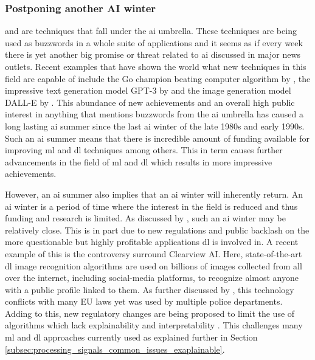 
\subsubsection{Postponing another AI winter}
\label{subsubsec:bci_gaining_popularity_improved_data_processing_no_ai_winter}

 and  are techniques that fall under the \gls{ai} umbrella.
These techniques are being used as buzzwords in a whole suite of applications and it seems as if every week there is yet another big promise or threat related to \gls{ai} discussed in major news outlets.
Recent examples that have shown the world what new techniques in this field are capable of include the Go champion beating computer algorithm by \citet{alphago}, the impressive text generation model GPT-3 by \citet{GPT3} and the image generation model DALL-E by \citet{dall_e}.
This abundance of new achievements and an overall high public interest in anything that mentions buzzwords from the \gls{ai} umbrella has caused a long lasting \gls{ai} summer since the last \gls{ai} winter of the late 1980s and early 1990s.
Such an \gls{ai} summer means that there is incredible amount of funding available for improving \gls{ml} and \gls{dl} techniques among others.
This in term causes further advancements in the field of \gls{ml} and \gls{dl} which results in more impressive achievements.

However, an \gls{ai} summer also implies that an \gls{ai} winter will inherently return.
An \gls{ai} winter is a period of time where the interest in the field is reduced and thus funding and research is limited.
As discussed by \citet{new_ai_winter}, such an \gls{ai} winter may be relatively close.
This is in part due to new regulations and public backlash on the more questionable but highly profitable applications \gls{dl} is involved in.
A recent example of this is the controversy surround Clearview AI.
Here, state-of-the-art \gls{dl} image recognition algorithms are used on billions of images collected from all over the internet, including social-media platforms, to recognize almost anyone with a public profile linked to them.
As further discussed by \citet{clearview_ai}, this technology conflicts with many EU laws yet was used by multiple police departments.
Adding to this, new regulatory changes are being proposed to limit the use of algorithms which lack explainability and interpretability \citep{eu_ai_blackbox_report, explainable_ai_policy}.
This challenges many \gls{ml} and \gls{dl} approaches currently used as explained further in Section \ref{subsec:processing_signals_common_issues_exaplainable}.

